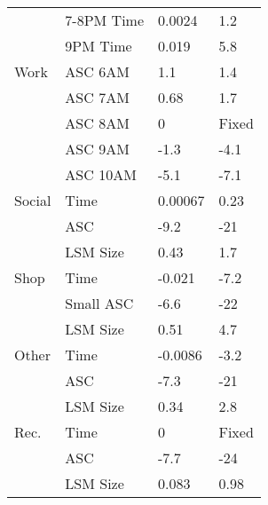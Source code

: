 \begin{table}
\begin{tabular}{llll}
                &                 7-8PM Time &     0.0024 &        1.2 \\ 
                &                 9PM Time &      0.019 &        5.8 \\ 
\noalign{\smallskip}
           Work &                  ASC 6AM &        1.1 &        1.4 \\ 
                &                  ASC 7AM &       0.68 &        1.7 \\ 
				&				   ASC 8AM &         0  &     Fixed\\
                &                  ASC 9AM &       -1.3 &       -4.1 \\ 
                &                 ASC 10AM &       -5.1 &       -7.1 \\ 
\noalign{\smallskip}
         Social &                     Time &    0.00067 &       0.23 \\ 
                &                      ASC &       -9.2 &        -21 \\ 
                &                 LSM Size &       0.43 &        1.7 \\ 
\noalign{\smallskip}
           Shop &                     Time &     -0.021 &       -7.2 \\ 
                &                Small ASC &       -6.6 &        -22 \\ 
                &                 LSM Size &       0.51 &        4.7 \\ 
\noalign{\smallskip}
          Other &                     Time &    -0.0086 &       -3.2 \\ 
                &                      ASC &       -7.3 &        -21 \\ 
                &                 LSM Size &       0.34 &        2.8 \\ 
\noalign{\smallskip}
           Rec. &             		  Time &          0 &       Fixed\\          
		        &                      ASC &       -7.7 &        -24 \\ 
                &                 LSM Size &      0.083 &       0.98 

\end{tabular}
\end{table}

